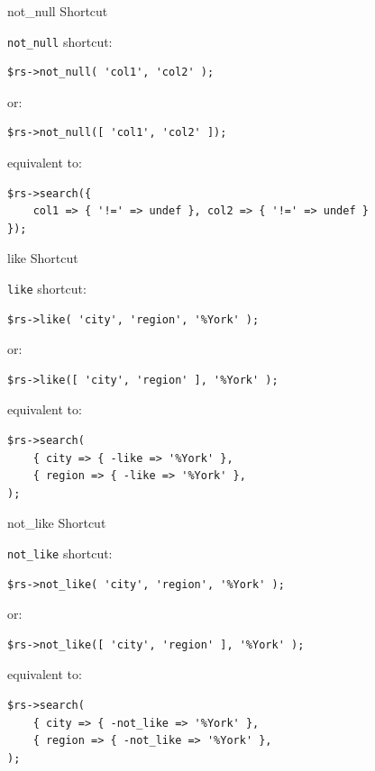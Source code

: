 
\begin{frame}[fragile]{not\_null Shortcut}

\verb|not_null| shortcut:

\begin{lstlisting}
$rs->not_null( 'col1', 'col2' );
\end{lstlisting}

or:

\begin{lstlisting}
$rs->not_null([ 'col1', 'col2' ]);
\end{lstlisting}

equivalent to:

\begin{lstlisting}
$rs->search({
    col1 => { '!=' => undef }, col2 => { '!=' => undef }
});
\end{lstlisting}
\end{frame}


\begin{frame}[fragile]{like Shortcut}

\verb|like| shortcut:

\begin{lstlisting}
$rs->like( 'city', 'region', '%York' );
\end{lstlisting}

or:

\begin{lstlisting}
$rs->like([ 'city', 'region' ], '%York' );
\end{lstlisting}

equivalent to:

\begin{lstlisting}
$rs->search(
    { city => { -like => '%York' },
    { region => { -like => '%York' },
);
\end{lstlisting}
\end{frame}


\begin{frame}[fragile]{not\_like Shortcut}

\verb|not_like| shortcut:

\begin{lstlisting}
$rs->not_like( 'city', 'region', '%York' );
\end{lstlisting}

or:

\begin{lstlisting}
$rs->not_like([ 'city', 'region' ], '%York' );
\end{lstlisting}

equivalent to:

\begin{lstlisting}
$rs->search(
    { city => { -not_like => '%York' },
    { region => { -not_like => '%York' },
);

\end{lstlisting}
\end{frame}

